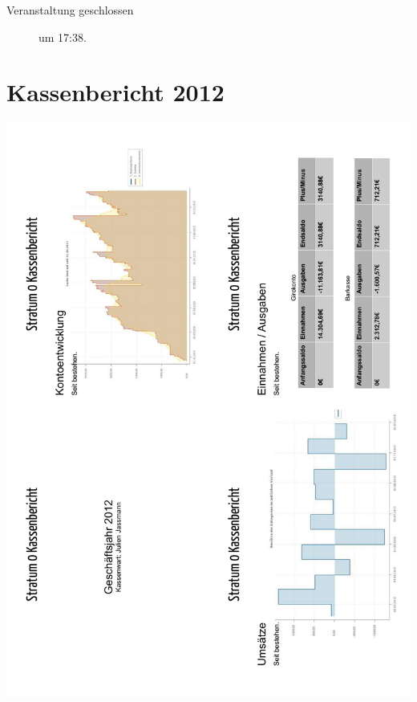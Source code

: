 \documentclass[a4paper,12pt]{scrartcl}
\begin{document}
\begin{description}
  \item[Veranstaltung geschlossen] um 17:38.
\end{description}


\appendix

\section{Kassenbericht 2012}
\includegraphics[width=\textwidth]{images/Kassenbericht_2012_1.pdf}
\newpage
\end{document}

